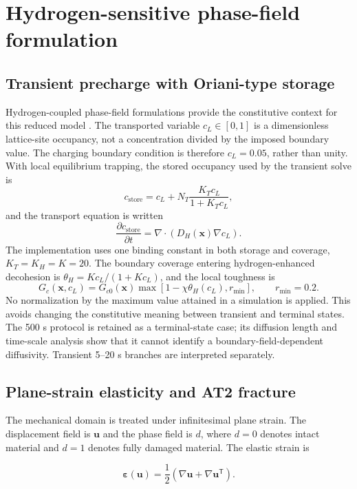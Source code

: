 \documentclass[preprint,12pt]{elsarticle}
\begin{document}
\section{Hydrogen-sensitive phase-field formulation}

\subsection{Transient precharge with Oriani-type storage}
Hydrogen-coupled phase-field formulations provide the constitutive context for this reduced model \cite{kristensen2020}. The transported variable $c_L\in[0,1]$ is a dimensionless lattice-site occupancy,
not a concentration divided by the imposed boundary value. The charging boundary
condition is therefore $c_L=0.05$, rather than unity. With local equilibrium
trapping, the stored occupancy used by the transient solve is
\[
c_{\mathrm{store}}
=c_L+N_T\frac{K_Tc_L}{1+K_Tc_L},
\]
and the transport equation is written
\[
\frac{\partial c_{\mathrm{store}}}{\partial t}
=\nabla\!\cdot\!\left(D_H(\mathbf{x})\nabla c_L\right).
\]
The implementation uses one binding constant in both storage and coverage, $K_T=K_H=K=20$. The boundary coverage entering hydrogen-enhanced decohesion is
\(
\theta_H=Kc_L/(1+Kc_L)
\), and the local toughness is
\[
G_c(\mathbf{x},c_L)=G_{c0}(\mathbf{x})
\max\!\left[1-\chi\theta_H(c_L),r_{\min}\right],
\qquad r_{\min}=0.2.
\]
No normalization by the maximum value attained in a simulation is applied. This
avoids changing the constitutive meaning between transient and terminal states.
The 500 s protocol is retained as a terminal-state case; its diffusion
length and time-scale analysis show that it cannot identify a boundary-field-dependent
diffusivity. Transient 5--20 s branches are interpreted separately.
\subsection{Plane-strain elasticity and AT2 fracture}

The mechanical domain is treated under infinitesimal plane strain. The displacement field is \(\mathbf{u}\) and the phase field is \(d\), where \(d=0\) denotes intact material and \(d=1\) denotes fully damaged material. The elastic strain is

\begin{equation}
\boldsymbol{\varepsilon}(\mathbf{u})=\frac{1}{2}\left(\nabla\mathbf{u}+\nabla\mathbf{u}^{\mathsf{T}}\right).
\end{equation}
\end{document}

